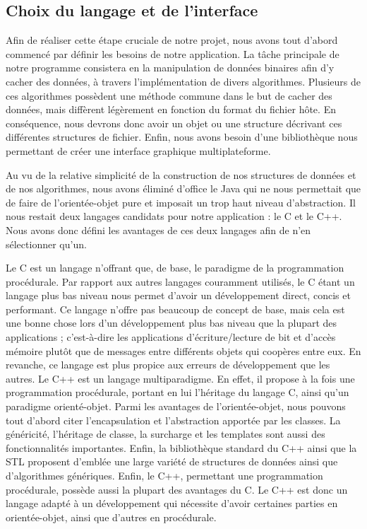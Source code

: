 \documentclass[11pt]{article}
\begin{document}
\subsection{Choix du langage et de l'interface} 
Afin de réaliser cette étape cruciale de notre projet, nous avons tout 
d’abord commencé par définir les besoins de notre application. La tâche 
principale de notre programme consistera en la manipulation de données 
binaires afin d’y cacher des données, à travers l’implémentation de divers 
algorithmes. Plusieurs de ces algorithmes possèdent une méthode commune dans
le but de cacher des données, mais diffèrent légèrement en fonction du 
format du fichier hôte. En conséquence, nous devrons donc avoir un objet
ou une structure décrivant ces différentes structures de fichier. Enfin, 
nous avons besoin d’une bibliothèque nous permettant de créer une interface 
graphique multiplateforme. 

Au vu de la relative simplicité de la construction de nos structures de 
données et de nos algorithmes, nous avons éliminé d’office le Java qui ne 
nous permettait que de faire de l’orientée-objet pure et imposait un trop 
haut niveau d’abstraction. Il nous restait deux langages candidats pour notre 
application : le C et le C++. Nous avons donc défini les avantages de ces 
deux langages afin de n'en sélectionner qu'un.

Le C est un langage n’offrant que, de base, le paradigme de la programmation 
procédurale. Par rapport aux autres langages couramment utilisés, le C étant 
un langage plus bas niveau nous permet d’avoir un développement direct, 
concis et performant. Ce langage n’offre pas beaucoup de concept de base, 
mais cela est une bonne chose lors d’un développement plus bas niveau que 
la plupart des applications ; c’est-à-dire les applications 
d’écriture/lecture de bit et d’accès mémoire plutôt que de messages entre 
différents objets qui coopères entre eux. En revanche, ce langage est plus 
propice aux erreurs de développement que les autres.
Le C++ est un langage multiparadigme. En effet, il propose à la fois une 
programmation procédurale, portant en lui l’héritage du langage C, ainsi 
qu'un paradigme orienté-objet. Parmi les avantages de l’orientée-objet, 
nous pouvons tout d’abord citer l’encapsulation et l’abstraction apportée 
par les classes. La généricité, l’héritage de classe, la surcharge et les 
templates sont aussi des fonctionnalités importantes. 
Enfin, la bibliothèque standard du C++ ainsi que la STL proposent d’emblée 
une large variété de structures de données ainsi que d’algorithmes génériques. 
Enfin, le C++, permettant une programmation procédurale, possède aussi la 
plupart des avantages du C. Le C++ est donc un langage adapté à un développement 
qui nécessite d’avoir certaines parties en orientée-objet, ainsi que d’autres 
en procédurale.
\end{document}
